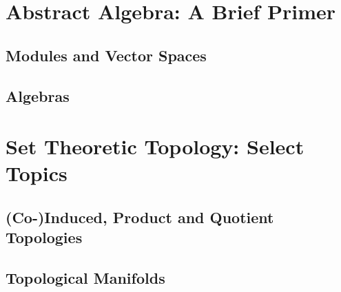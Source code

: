 \section{Abstract Algebra: A Brief Primer}

\subsection{Modules and Vector Spaces}
\lipsum[3-5]

\subsection{Algebras}
\lipsum[3-5]

\section{Set Theoretic Topology: Select Topics}

\subsection{(Co-)Induced, Product and Quotient Topologies}
\lipsum[3-5]

\subsection{Topological Manifolds}
\lipsum[3-5]







